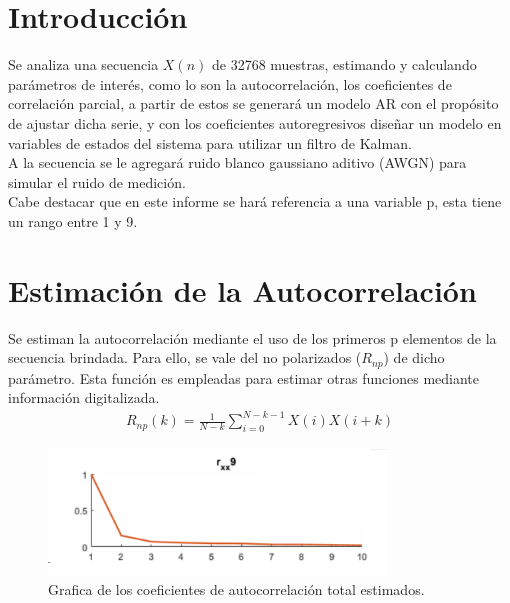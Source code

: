 







\tableofcontents
\newpage



\section{Introducción}

Se analiza una secuencia $X(n)$ de 32768 muestras, estimando y calculando parámetros de interés, como lo son la autocorrelación, los coeficientes de correlación parcial, a partir de estos se generará un modelo AR con el propósito de ajustar dicha serie, y con los coeficientes autoregresivos diseñar un modelo en variables de estados del sistema para utilizar un filtro de Kalman.\\
A la secuencia se le agregará ruido blanco gaussiano aditivo (AWGN) para simular el ruido de medición.\\
Cabe destacar que en este informe se hará referencia a una variable p, esta tiene un rango entre 1 y 9.\\

\section{Estimación de la Autocorrelación} 

Se estiman la autocorrelación mediante el uso de los primeros p elementos de la secuencia brindada. Para ello, se vale del  no polarizados ($R_{np}$) de dicho parámetro. Esta función es  empleadas para estimar otras funciones mediante información digitalizada.
\begin{equation}
\begin{gathered}
	R_{np}(k) = \frac{1}{N-k} \sum_{i=0}^{N-k-1} X(i)X(i+k)
\end{gathered}
\end{equation}


\begin{figure}[H]
\centering
	\includegraphics[width=0.8\textwidth, trim = {0 0 0 0},clip]{./Imagenes/correlacion.png}
	\caption{Grafica de los coeficientes de autocorrelación total estimados.}
	\label{fig:rxx}
\end{figure}



